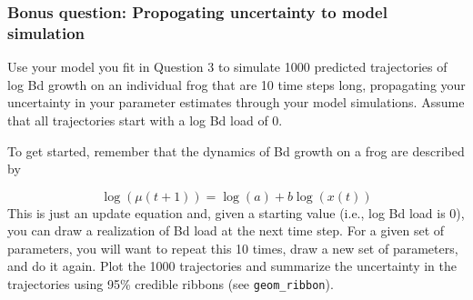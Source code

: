 \documentclass[
]{article}
\begin{document}
\subsubsection{Bonus question: Propogating uncertainty to model
simulation}\label{bonus-question-propogating-uncertainty-to-model-simulation}

Use your model you fit in Question 3 to simulate 1000 predicted
trajectories of log Bd growth on an individual frog that are 10 time
steps long, propagating your uncertainty in your parameter estimates
through your model simulations. Assume that all trajectories start with
a log Bd load of 0.

To get started, remember that the dynamics of Bd growth on a frog are
described by

\[
\log(\mu(t + 1)) = \log(a) + b \log(x(t))
\] This is just an update equation and, given a starting value (i.e.,
log Bd load is 0), you can draw a realization of Bd load at the next
time step. For a given set of parameters, you will want to repeat this
10 times, draw a new set of parameters, and do it again. Plot the 1000
trajectories and summarize the uncertainty in the trajectories using
95\% credible ribbons (see \texttt{geom\_ribbon}).
\end{document}
